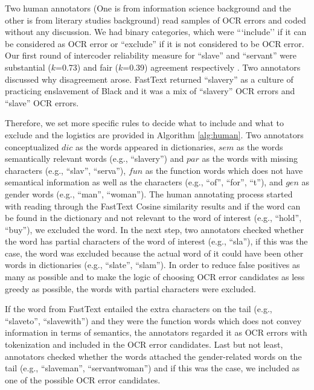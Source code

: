 \documentclass[11pt]{article}
\begin{document}
Two human annotators (One is from information science background and the other is from literary studies background) read samples of OCR errors and coded without any discussion. 
We had binary categories, which were ```include'' if it can be considered as OCR error or ``exclude'' if it is not considered to be OCR error. 
Our first round of intercoder reliability measure \citep{cohen_coefficient_1960}
for ``slave'' and ``servant'' were substantial ($k$=0.73) and fair ($k$=0.39) agreement respectively \citep{viera_understanding_nodate}. 
Two annotators discussed why disagreement arose. FastText returned ``slavery'' as a culture of practicing enslavement of Black and it was a mix of ``slavery'' OCR errors and ``slave'' OCR errors. 

Therefore, we set more specific rules to decide what to include and what to exclude and the logistics are provided in Algorithm \ref{alg:human}. Two annotators conceptualized $dic$ as the words appeared in dictionaries, $sem$ as the words semantically relevant words (e.g., ``slavery'') and $par$ as the words with missing characters (e.g., ``slav'', ``serva''), $fun$ as the function words which does not have semantical information as well as the characters (e.g., ``of'', ``for'', ``t''), and $gen$ as gender words (e.g., ``man'', ``woman''). 
The human annotating process started with reading through the FastText Cosine similarity results and if the word can be found in the dictionary and not relevant to the word of interest (e.g., ``hold'', ``buy''), we excluded the word. 
In the next step, two annotators checked whether the word has partial characters of the word of interest (e.g., ``sla''), if this was the case, the word was excluded because the actual word of it could have been  other words in dictionaries (e.g., ``slate'', ``slam''). 
In order to reduce false positives as many as possible and to make the logic of choosing OCR error candidates as less greedy as possible, the words with partial characters were excluded. 

If the word from FastText entailed the extra characters on the tail (e.g., ``slaveto'', ``slavewith'') and they were the function words which does not convey information in terms of semantics, the annotators regarded it as OCR errors with tokenization and included in the OCR error candidates. 
Last but not least, annotators checked whether the words attached the gender-related words on the tail (e.g., ``slaveman'', ``servantwoman'') and if this was the case, we included as one of the possible OCR error candidates. 
\end{document}

